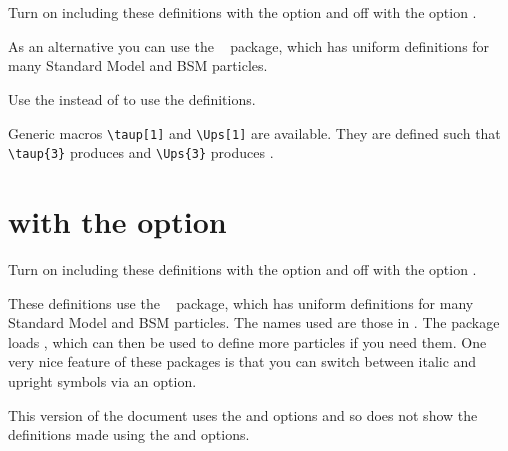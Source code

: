 \documentclass[REPORT=false, mhchem, UKenglish]{atlasdoc}
\begin{document}
\maketitle

\tableofcontents



\twocolumn
\section{}

Turn on including these definitions with the option  and off with the option .

As an alternative you can use the ~\cite{hepparticles} package,
which has uniform definitions for many Standard Model and BSM particles.

Use the  instead of  to use the  definitions.



Generic macros \verb|\taup[1]| and \verb|\Ups[1]| are available.
They are defined such that
\verb|\taup{3}| produces  and
\verb|\Ups{3}| produces .


\newpage
\section{ with the  option}

Turn on including these definitions with the option  and off with the option .

These definitions use the ~\cite{hepparticles} package,
which has uniform definitions for many Standard Model and BSM particles.
The names used are those in .
The package loads , which can then be used to define more particles if you need them.
One very nice feature of these packages is that you can switch between italic and upright symbols via an option.

This version of the document uses the  and  options and so
does not show the definitions made using the  and  options.
%
\end{document}
